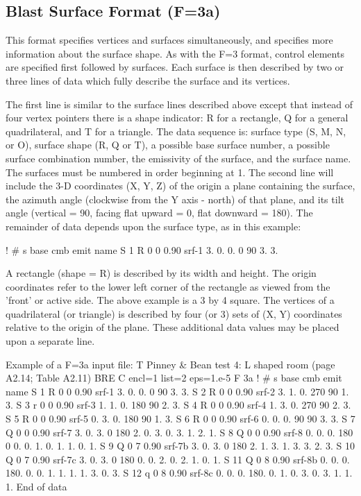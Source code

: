 \documentclass[10pt]{article}
\begin{document}
\subsection{Blast Surface Format (F=3a)}\label{Feq3a}
This format specifies vertices and surfaces simultaneously, and specifies more
information about the surface shape.  As with the F=3 format, control elements
are specified first followed by surfaces.  Each surface is then described by
two or three lines of data which fully describe the surface and its vertices.

The first line is similar to the surface lines described above except that
instead of four vertex pointers there is a shape indicator: R for a rectangle,
Q for a general quadrilateral, and T for a triangle.  The data sequence is:
surface type (S, M, N, or O), surface shape (R, Q or T), a possible base
surface number, a possible surface combination number, the emissivity of the
surface, and the surface name. The surfaces must be numbered in order beginning
at 1.  The second line will include the 3-D coordinates (X, Y, Z) of the origin
a plane containing the surface, the azimuth angle (clockwise from the Y axis -
north) of that plane, and its tilt angle (vertical = 90, facing flat upward = 0,
flat downward = 180).  The remainder of data depends upon the surface type, 
as in this example:

\begin{vs3file}
!  #  s base cmb emit  name
S  1  R   0   0  0.90  srf-1
  3. 0. 0.    0  90    3. 3.
\end{vs3file}

A rectangle (shape = R) is described by its width and height.  The origin
coordinates refer to the lower left corner of the rectangle as viewed from the
'front' or active side.  The above example is a 3 by 4 square.  The vertices of
a quadrilateral (or triangle) is described by four (or 3) sets of (X, Y)
coordinates relative to the origin of the plane.  These additional data values
may be placed upon a separate line.

\begin{vs3file}
Example of a F=3a input file:
T Pinney & Bean test 4: L shaped room (page A2.14; Table A2.11) BRE
C  encl=1 list=2 eps=1.e-5
F  3a
!  #  s base cmb emit  name
S  1  R   0   0  0.90  srf-1
  3. 0. 0.    0  90    3. 3.
S  2  R   0   0  0.90  srf-2
  3. 1. 0.  270  90    1. 3.
S  3  r   0   0  0.90  srf-3
  1. 1. 0.  180  90    2. 3.
S  4  R   0   0  0.90  srf-4
  1. 3. 0.  270  90    2. 3.
S  5  R   0   0  0.90  srf-5
  0. 3. 0.  180  90    1. 3.
S  6  R   0   0  0.90  srf-6
  0. 0. 0.   90  90    3. 3.
S  7  Q   0   0  0.90  srf-7
  3. 0. 3.    0  180 
  2. 0.   3. 0.   3. 1.   2. 1.
S  8  Q   0   0  0.90  srf-8
  0. 0. 0.  180   0 
  0. 0.   1. 0.   1. 1.   0. 1.
S  9  Q   0   7  0.90  srf-7b
  3. 0. 3.    0  180 
  2. 1.   3. 1.   3. 3.   2. 3.
S 10  Q   0   7  0.90  srf-7c
  3. 0. 3.    0  180 
  0. 0.   2. 0.   2. 1.   0. 1.
S 11  Q   0   8  0.90  srf-8b
  0. 0. 0.  180.  0.
  0. 1.   1. 1.   1. 3.   0. 3.
S 12  q   0   8  0.90  srf-8c
  0. 0. 0.  180.  0.
  1. 0.   3. 0.   3. 1.   1. 1.
End of data
\end{vs3file}
\end{document}
